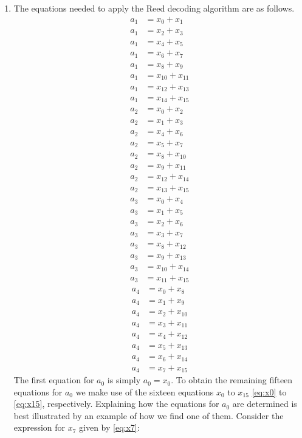 \begin{enumerate}[label=(\roman*)]
\item The equations needed to apply the Reed decoding algorithm are as follows.
\begin{align}
\label{eq:a1_first}
	a_1 &= x_0 + x_1\\
	a_1 &= x_2 + x_3\\
	a_1 &= x_4 + x_5\\
	a_1 &= x_6 + x_7\\
	a_1 &= x_8 + x_9\\
	a_1 &= x_{10} + x_{11}\\
	a_1 &= x_{12} + x_{13}\\
\label{eq:a1_last}
	a_1 &= x_{14} + x_{15}
\end{align}
\begin{align}
	a_2 &= x_0 + x_2\\
	a_2 &= x_1 + x_3\\
	a_2 &= x_4 + x_6\\
	a_2 &= x_5 + x_7\\
	a_2 &= x_8 + x_{10}\\
	a_2 &= x_{9} + x_{11}\\
	a_2 &= x_{12} + x_{14}\\
	a_2 &= x_{13} + x_{15}
\end{align}
\begin{align}
	a_3 &= x_0 + x_4\\
	a_3 &= x_1 + x_5\\
	a_3 &= x_2 + x_6\\
	a_3 &= x_3 + x_7\\
	a_3 &= x_8 + x_{12}\\
	a_3 &= x_{9} + x_{13}\\
	a_3 &= x_{10} + x_{14}\\
	a_3 &= x_{11} + x_{15}
\end{align}
\begin{align}
	a_4 &= x_0 + x_8\\
	a_4 &= x_1 + x_9\\
	a_4 &= x_2 + x_{10}\\
	a_4 &= x_3 + x_{11}\\
	a_4 &= x_4 + x_{12}\\
	a_4 &= x_{5} + x_{13}\\
	a_4 &= x_{6} + x_{14}\\
	a_4 &= x_{7} + x_{15}
\end{align}
The first equation for $a_0$ is simply $a_0 = x_0$. To obtain the remaining fifteen equations for $a_0$ we make use of the sixteen equations $x_0$ to $x_{15}$ \eqref{eq:x0} to \eqref{eq:x15}, respectively. Explaining how the equations for $a_0$ are determined is best illustrated by an example of how we find one of them. Consider the expression for $x_7$ given by \eqref{eq:x7}:


\end{enumerate}
